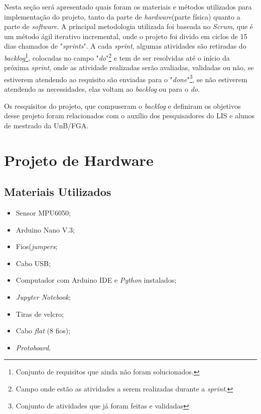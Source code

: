 Nesta seção será apresentado quais foram os materiais e métodos utilizados para implementação do projeto, tanto da parte de \textit{hardware}(parte física) quanto a parte de \textit{software}. A principal metodologia utilizada foi baseada  no \textit{Scrum}, que é um método ágil iterativo incremental, onde o projeto foi divido em ciclos de 15 dias chamados de "\textit{sprints}". A cada \textit{sprint}, algumas atividades são retiradas do \textit{backlog}\footnote{Conjunto de requisitos que ainda não foram solucionados.}, colocadas no campo "\textit{do}"\footnote{Campo onde estão as atividades a serem realizadas durante a \textit{sprint}.}  e tem de ser resolvidas até o início da próxima \textit{sprint}, onde as atividade realizadas serão avaliadas,  validadas ou não, se estiverem atendendo ao requisito são enviadas para o "\textit{done}"\footnote{Conjunto de atividades que já foram feitas e validadas}, se não estiverem atendendo as necessidades, elas voltam ao \textit{backlog} ou para o \textit{do}.

Os resquisitos do projeto, que compuseram o \textit{backlog} e definiram os objetivos desse projeto foram relacionados com o auxílio dos pesquisadores do LIS e alunos de mestrado da UnB/FGA.

\section{Projeto de Hardware}


 
	\subsection{Materiais Utilizados}
		\begin{itemize}
			
			\item Sensor MPU6050;
			\item Arduino Nano V.3;
			\item Fios(\textit{jumpers};
			\item Cabo USB;
			\item Computador com Arduino IDE e \textit{Python} instalados;
			\item \textit{Jupyter Notebook};
			\item Tiras de velcro;
			\item Cabo \textit{flat} (8 fios);
			\item \textit{Protoboard}.
			
		\end{itemize}	
	 
